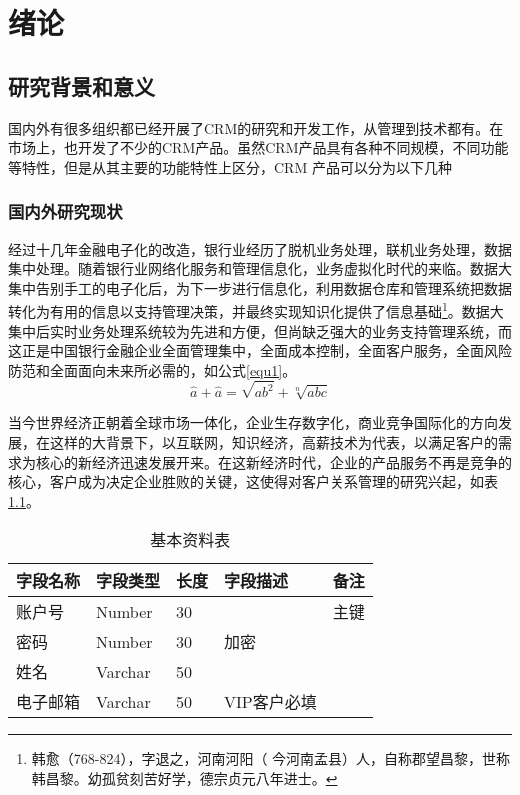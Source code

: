 ﻿%
\chapter{绪论}
\section {研究背景和意义}
国内外有很多组织都已经开展了CRM的研究和开发工作，从管理到技术都有。在市场上，也开发了不少的CRM产品。虽然CRM产品具有各种不同规模，不同功能等特性，但是从其主要的功能特性上区分，CRM 产品可以分为以下几种
\subsection{国内外研究现状}
经过十几年金融电子化的改造，银行业经历了脱机业务处理，联机业务处理，数据集中处理。随着银行业网络化服务和管理信息化，业务虚拟化时代的来临。数据大集中告别手工的电子化后，为下一步进行信息化，利用数据仓库和管理系统把数据转化为有用的信息以支持管理决策，并最终实现知识化提供了信息基础\footnote{韩愈（768-824），字退之，河南河阳（
  今河南孟县）人，自称郡望昌黎，世称韩昌黎。幼孤贫刻苦好学，德宗贞元八年进士。}。数据大集中后实时业务处理系统较为先进和方便，但尚缺乏强大的业务支持管理系统，而这正是中国银行金融企业全面管理集中，全面成本控制，全面客户服务，全面风险防范和全面面向未来所必需的，如公式\ref{equ1}。
  \begin{equation}\label{equ1}
    \hat{a}+\hat{a}=\sqrt{{ab}^2}+\sqrt[n]{abc}
  \end{equation}

当今世界经济正朝着全球市场一体化，企业生存数字化，商业竞争国际化的方向发展，在这样的大背景下，以互联网，知识经济，高薪技术为代表，以满足客户的需求为核心的新经济迅速发展开来。在这新经济时代，企业的产品服务不再是竞争的核心，客户成为决定企业胜败的关键，这使得对客户关系管理的研究兴起，如表\ref{dataT}。
\renewcommand\arraystretch{1.5}
\begin{table}[!htb]
\centering
\caption{基本资料表}
\label{dataT}
\begin{tabular}{|l|l|l|l|l|}
\hline
\textbf{字段名称} & \textbf{字段类型} & \textbf{长度} & \textbf{字段描述} & \textbf{备注} \\ \hline
账户号           & Number        & 30          &               & 主键          \\ \hline
密码            & Number        & 30          & 加密            &             \\ \hline
姓名            & Varchar       & 50          &               &             \\ \hline
电子邮箱          & Varchar       & 50          & VIP客户必填       &             \\ \hline
\end{tabular}
\end{table}


